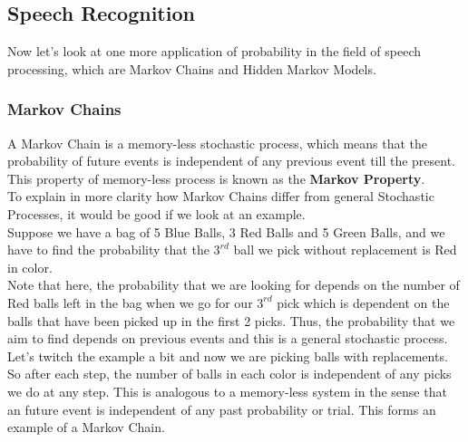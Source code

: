 \documentclass[10pt,twocolumn,letterpaper]{article}
\begin{document}
\subsection{Speech Recognition}

Now let's look at one more application of probability in the field of speech processing, which are Markov Chains and Hidden Markov Models.


\subsubsection{Markov Chains}
A Markov Chain is a memory-less stochastic process, which means that the probability of future events is independent of any previous event till the present. This property of memory-less process is known as the \textbf{Markov Property}. \\

To explain in more clarity how Markov Chains differ from general Stochastic Processes, it would be good if we look at an example. \\

Suppose we have a bag of 5 Blue Balls, 3 Red Balls and 5 Green Balls, and we have to find the probability that the $3^{rd}$ ball we pick without replacement is Red in color. \\

Note that here, the probability that we are looking for depends on the number of Red balls left in the bag when we go for our $3^{rd}$ pick which is dependent on the balls that have been picked up in the first 2 picks. Thus, the probability that we aim to find depends on previous events and this is a general stochastic process.\\

Let's twitch the example a bit and now we are picking balls with replacements. So after each step, the number of balls in each color is independent of any picks we do at any step. This is analogous to a memory-less system in the sense that an future event is independent of any past probability or trial. This forms an example of a Markov Chain. \\

\end{document}
